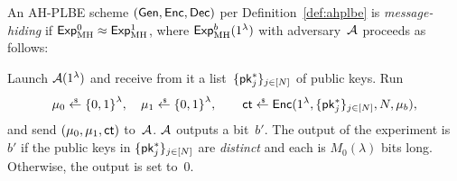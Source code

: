\begin{definition}\label{def:ahplbe-message-hiding}
An AH-PLBE scheme $(\Gen,\Enc,\Dec)$ per Definition~\ref{def:ahplbe}
is \emph{message-hiding} if ${\ExpMH{0}\approx\ExpMH{1}}$,
where $\ExpMH{b}(1^\lambda)$ with adversary~${\mathcal{A}}$ proceeds as follows:
\begin{security}
Launch ${\mathcal{A}}(1^\lambda)$ and
receive from it a list~$\{\pk^\ast_j\}_{j\in[N]}$ of public keys.
Run
\begin{align*}
\mu_0\draws\bit^\lambda,\quad
\mu_1\draws\bit^\lambda,\qquad
\ct\draws\Enc(1^\lambda,\{\pk^\ast_j\}_{j\in[N]},N,\mu_b),
\end{align*}
and send $(\mu_0,\mu_1,\ct)$ to~${\mathcal{A}}$.
${\mathcal{A}}$ outputs a bit~$b'$.
The output of the experiment is~$b'$
if the public keys in $\{\pk^\ast_j\}_{j\in[N]}$ are \emph{distinct} and each is $M_0(\lambda)$ bits long.
Otherwise, the output is set to~$0$.
\end{security}
\end{definition}
